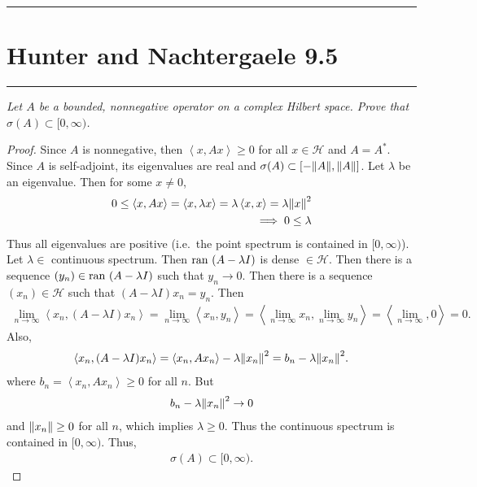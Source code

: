 \documentclass{article} %
\theoremstyle{plain}
\newcommand{\VEC}[2]{\left\langle #1, #2 \right\rangle}
\newcommand{\ran}{\text{\rm ran }}
\newcommand{\Hilb}{\mathcal{H}}
\newcommand{\problem}[1]{
\vspace{.375cm}
\begin{minipage}{\textwidth}
    \begin{center}
        \noindent\rule{5cm}{1pt}
    \end{center}
    \section{\bf #1}
    \begin{center}
        \noindent\rule{5cm}{1pt}
    \end{center}
    \vspace{0.25cm}
\end{minipage}
}
\numberwithin{equation}{section} %
\numberwithin{figure}{section} %
\numberwithin{table}{section} %
\begin{document}
\problem{Hunter and Nachtergaele 9.5}
\emph{Let $A$ be a bounded, nonnegative operator on a complex Hilbert space.  Prove that $\sigma(A) \subset [0, \infty)$.}
\begin{proof}
    Since $A$ is nonnegative, then $\VEC{x}{Ax} \geq 0$ for all $x \in \Hilb$ and $A = A^*$.  Since $A$ is self-adjoint, its eigenvalues are real and $\sigma(A) \subset \qty[-\norm{A}, \norm{A}]$.  Let $\lambda$ be an eigenvalue.  Then for some $x \neq 0$,
    \begin{align*}
        0 \leq \VEC{x}{Ax} = \VEC{x}{\lambda x} = \lambda \VEC{x}{x} = \lambda \norm{x}^2 \\
        \implies 0 \leq \lambda
    \end{align*}
    Thus all eigenvalues are positive (i.e.~the point spectrum is contained in $[0, \infty)$).  Let $\lambda \in $ continuous spectrum.  Then $\ran(A - \lambda I)$ is dense $\in \Hilb$.  Then there is a sequence $(y_n) \in \ran(A - \lambda I)$ such that $y_n \rightarrow 0$.  Then there is a sequence $(x_n) \in \Hilb$ such that $(A - \lambda I)x_n = y_n$.  Then
    \begin{align*}
        \lim_{n\rightarrow \infty}\VEC{x_n}{(A - \lambda I)x_n} = \lim_{n\rightarrow \infty}\VEC{x_n}{y_n} = \VEC{\lim_{n\rightarrow\infty}x_n}{\lim_{n\rightarrow\infty}y_n} = \VEC{\lim_{n\rightarrow\infty}}{0} = 0.
    \end{align*}
    Also,
    \begin{align*}
        \VEC{x_n}{(A - \lambda I)x_n} = \VEC{x_n}{Ax_n} - \lambda \norm{x_n}^2 = b_n - \lambda \norm{x_n}^2.
    \end{align*}
    where $b_n = \VEC{x_n}{Ax_n} \geq 0$ for all $n$.  But
    \begin{align*}
        b_n - \lambda \norm{x_n}^2 \rightarrow 0
    \end{align*}
    and $\norm{x_n} \geq 0$ for all $n$, which implies $\lambda \geq 0$.  Thus the continuous spectrum is contained in $[0, \infty)$.  Thus,
    \begin{align*}
        \sigma(A) \subset [0, \infty).
    \end{align*}
\end{proof}
\end{document}
